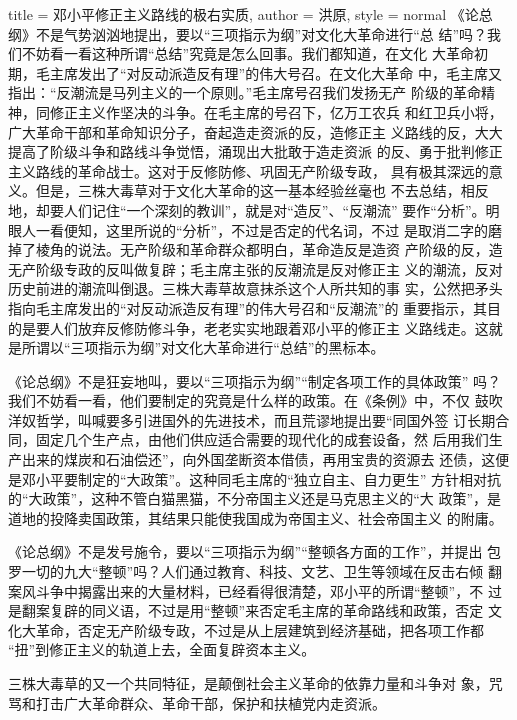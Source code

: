 \begin{hongqiarticle}{
        title  = {邓小平修正主义路线的极右实质},
        author = {洪原},
        style  = normal
    }
    《论总纲》不是气势汹汹地提出，要以“三项指示为纲”对文化大革命进行“总
    结”吗？我们不妨看一看这种所谓“总结”究竟是怎么回事。我们都知道，在文化
    大革命初期，毛主席发出了“对反动派造反有理”的伟大号召。在文化大革命
    中，毛主席又指出：“反潮流是马列主义的一个原则。”毛主席号召我们发扬无产
    阶级的革命精神，同修正主义作坚决的斗争。在毛主席的号召下，亿万工农兵
    和红卫兵小将，广大革命干部和革命知识分子，奋起造走资派的反，造修正主
    义路线的反，大大提高了阶级斗争和路线斗争觉悟，涌现出大批敢于造走资派
    的反、勇于批判修正主义路线的革命战士。这对于反修防修、巩固无产阶级专政，
    具有极其深远的意义。但是，三株大毒草对于文化大革命的这一基本经验丝毫也
    不去总结，相反地，却要人们记住“一个深刻的教训”，就是对“造反”、“反潮流”
    要作“分析”。明眼人一看便知，这里所说的“分析”，不过是否定的代名词，不过
    是取消二字的磨掉了棱角的说法。无产阶级和革命群众都明白，革命造反是造资
    产阶级的反，造无产阶级专政的反叫做复辟；毛主席主张的反潮流是反对修正主
    义的潮流，反对历史前进的潮流叫倒退。三株大毒草故意抹杀这个人所共知的事
    实，公然把矛头指向毛主席发出的“对反动派造反有理”的伟大号召和“反潮流”的
    重要指示，其目的是要人们放弃反修防修斗争，老老实实地跟着邓小平的修正主
    义路线走。这就是所谓以“三项指示为纲”对文化大革命进行“总结”的黑标本。

    《论总纲》不是狂妄地叫，要以“三项指示为纲”“制定各项工作的具体政策”
    吗？我们不妨看一看，他们要制定的究竟是什么样的政策。在《条例》中，不仅
    鼓吹洋奴哲学，叫喊要多引进国外的先进技术，而且荒谬地提出要“同国外签
    订长期合同，固定几个生产点，由他们供应适合需要的现代化的成套设备，然
    后用我们生产出来的煤炭和石油偿还”，向外国垄断资本借债，再用宝贵的资源去
    还债，这便是邓小平要制定的“大政策”。这种同毛主席的“独立自主、自力更生”
    方针相对抗的“大政策”，这种不管白猫黑猫，不分帝国主义还是马克思主义的“大
    政策”，是道地的投降卖国政策，其结果只能使我国成为帝国主义、社会帝国主义
    的附庸。

    《论总纲》不是发号施令，要以“三项指示为纲”“整顿各方面的工作”，并提出
    包罗一切的九大“整顿”吗？人们通过教育、科技、文艺、卫生等领域在反击右倾
    翻案风斗争中揭露出来的大量材料，已经看得很清楚，邓小平的所谓“整顿”，不
    过是翻案复辟的同义语，不过是用“整顿”来否定毛主席的革命路线和政策，否定
    文化大革命，否定无产阶级专政，不过是从上层建筑到经济基础，把各项工作都
    “扭”到修正主义的轨道上去，全面复辟资本主义。

    三株大毒草的又一个共同特征，是颠倒社会主义革命的依靠力量和斗争对
    象，咒骂和打击广大革命群众、革命干部，保护和扶植党内走资派。


\end{hongqiarticle}
